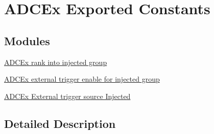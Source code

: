 \hypertarget{group___a_d_c_ex___exported___constants}{\section{A\-D\-C\-Ex Exported Constants}
\label{group___a_d_c_ex___exported___constants}
}
\subsection*{Modules}
\begin{DoxyCompactItemize}
\item 
\hyperlink{group___a_d_c_ex__injected__rank}{A\-D\-C\-Ex rank into injected group}
\item 
\hyperlink{group___a_d_c_ex___external__trigger__edge___injected}{A\-D\-C\-Ex external trigger enable for injected group}
\item 
\hyperlink{group___a_d_c_ex___external__trigger__source___injected}{A\-D\-C\-Ex External trigger source Injected}
\end{DoxyCompactItemize}


\subsection{Detailed Description}
